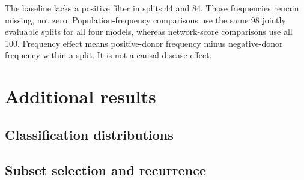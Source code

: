 \documentclass[11pt,a4paper]{article}
\begin{document}
The baseline lacks a positive filter in splits 44 and 84. Those frequencies remain missing, not zero. Population-frequency comparisons use the same 98 jointly evaluable splits for all four models, whereas network-score comparisons use all 100. Frequency effect means positive-donor frequency minus negative-donor frequency within a split. It is not a causal disease effect.

\section{Additional results}
\subsection{Classification distributions}
\begin{table}[htb]\centering\small

\caption{Three-method benchmark on the 30 common splits: median [Q1, Q3]. AUC and AP are score-based, while BA uses the method's declared decision threshold.}
\end{table}
\begin{table}[htb]\centering\small

\caption{Means over the same 30 splits. Means and medians are deliberately reported separately.}
\end{table}
\begin{table}[htb]\centering\small

\caption{Additional CellCNN/SVM comparison over all 100 stored splits: median [Q1, Q3]. This is a separate comparison, not an extension of Citrus to 100 splits.}
\end{table}
\begin{table}[htb]\centering\footnotesize

\caption{Paired AUC differences on identical donor splits. Better/equal/worse counts describe the first method relative to the second. No independence-based significance test is inferred from these overlapping repeats.}
\end{table}

\subsection{Subset selection and recurrence}
\begin{table}[htb]\centering\small

\caption{Selection on the fixed 10,000-cell map and profile availability over 180 full-test-donor visits per method. The denominator for a cell is all test visits of its own donor, not 30.}
\end{table}
\begin{table}[htb]\centering\small

\caption{Recurring training-subset groups from the original centroid analysis. Splits count unique occurrences. Positive and negative counts may overlap within a group.}
\end{table}
\end{document}
